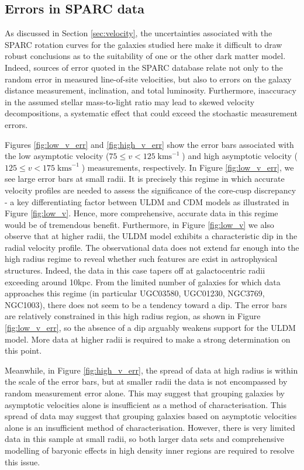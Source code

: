 \documentclass{pasa}%
\begin{document}
\begin{appendix}
 
\section{Errors in SPARC data}\label{sec:errors}

As discussed in Section \ref{sec:velocity}, the uncertainties associated with the SPARC rotation curves for the galaxies studied here make it difficult to draw robust conclusions as to the suitability of one or the other dark matter model. Indeed, sources of error quoted in the SPARC database relate not only to the random error in measured line-of-site velocities, but also to errors on the galaxy distance measurement, inclination, and total luminosity. Furthermore, inaccuracy in the assumed stellar mass-to-light ratio may lead to skewed velocity decompositions, a systematic effect that could exceed the stochastic measurement errors.

Figures \ref{fig:low_v_err} and \ref{fig:high_v_err} show the error bars associated with the low asymptotic velocity ($75 \leq v < 125\operatorname{kms}^{-1}$) and high asymptotic velocity ($125 \leq v < 175\operatorname{kms}^{-1}$) measurements, respectively. In Figure \ref{fig:low_v_err}, we see large error bars at small radii. It is precisely this regime in which accurate velocity profiles are needed to assess the significance of the core-cusp discrepancy - a key differentiating factor between ULDM and CDM models as illustrated in Figure \ref{fig:low_v}. Hence, more comprehensive, accurate data in this regime would be of tremendous benefit. Furthermore, in Figure \ref{fig:low_v} we also observe that at higher radii, the ULDM model exhibits a characteristic dip in the radial velocity profile. The observational data does not extend far enough into the high radius regime to reveal whether such features are exist in astrophysical structures. Indeed, the data in this case tapers off at galactocentric radii exceeding around 10kpc. From the limited number of galaxies for which data approaches this regime (in particular  UGC03580, UGC01230, NGC3769, NGC1003), there does not seem to be a tendency toward a dip. The error bars are relatively constrained in this high radius region, as shown in Figure \ref{fig:low_v_err}, so the absence of a dip arguably weakens support for the ULDM model. More data at higher radii is required to make a strong determination on this point. 

Meanwhile, in Figure \ref{fig:high_v_err}, the spread of data at high radius is within the scale of the error bars, but at smaller radii the data is not encompassed by random measurement error alone. This may suggest that grouping galaxies by asymptotic velocities alone is insufficient as a method of characterisation. This spread of data may suggest that grouping galaxies based on asymptotic velocities alone is an insufficient method of characterisation. However, there is very limited data in this sample at small radii, so both larger data sets and comprehensive modelling of baryonic effects in high density inner regions are required to resolve this issue. 




\end{appendix}
\end{document}
